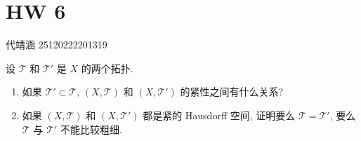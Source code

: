 \documentclass[../main.tex]{subfiles}
\begin{document}
\ifSubfilesClassLoaded{

    
    \setcounter{chapter}{5}
}{}

\chapter{ HW 6 }
代靖涵 25120222201319
\begin{exercise}{}{}
设 $\mathcal{T}$ 和 $\mathcal{T}'$ 是 $X$ 的两个拓扑.
\begin{enumerate}
    \item 如果 $\mathcal{T}' \subset \mathcal{T}$, $(X, \mathcal{T})$ 和 $(X, \mathcal{T}')$ 的紧性之间有什么关系?
    \item 如果 $(X, \mathcal{T})$ 和 $(X, \mathcal{T}')$ 都是紧的 Hausdorff 空间, 证明要么 $\mathcal{T} = \mathcal{T}'$, 要么 $\mathcal{T}$ 与 $\mathcal{T}'$ 不能比较粗细.
\end{enumerate}
\end{exercise}
\end{document}
